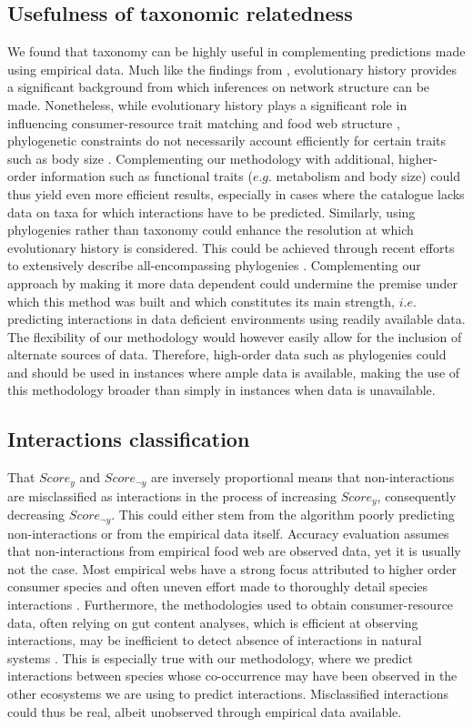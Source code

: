 \subsection{Usefulness of taxonomic relatedness}
We found that taxonomy can be highly useful in complementing predictions made using empirical data. Much like the findings from \citet{eklof2016}, evolutionary history provides a significant background from which inferences on network structure can be made. Nonetheless, while evolutionary history plays a significant role in influencing consumer-resource trait matching and food web structure \citep{mouquet2012, rohr2014}, phylogenetic constraints do not necessarily account efficiently for certain traits such as body size \citep{eklof2016}. Complementing our methodology with additional, higher-order information such as functional traits ($e.g.$ metabolism and body size) could thus yield even more efficient results, especially in cases where the catalogue lacks data on taxa for which interactions have to be predicted. Similarly, using phylogenies rather than taxonomy could enhance the resolution at which evolutionary history is considered. This could be achieved through recent efforts to extensively describe all-encompassing phylogenies \citep[e.g.][]{Hedges2015}. Complementing our approach by making it more data dependent could undermine the premise under which this method was built and which constitutes its main strength, $i.e.$ predicting interactions in data deficient environments using readily available data. The flexibility of our methodology would however easily allow for the inclusion of alternate sources of data. Therefore, high-order data such as phylogenies could and should be used in instances where ample data is available, making the use of this methodology broader than simply in instances when data is unavailable.

\subsection{Interactions classification}
That $Score_{y}$ and $Score_{\neg y}$ are inversely proportional means that non-interactions are misclassified as interactions in the process of increasing $Score_y$, consequently decreasing $Score_{\neg y}$. This could either stem from the algorithm poorly predicting non-interactions or from the empirical data itself. Accuracy evaluation assumes that non-interactions from empirical food web are observed data, yet it is usually not the case. Most empirical webs have a strong focus attributed to higher order consumer species and often uneven effort made to thoroughly detail species interactions \citep{dunne2006}. Furthermore, the methodologies used to obtain consumer-resource data, often relying on gut content analyses, which is efficient at observing interactions, may be inefficient to detect absence of interactions in natural systems \citep{dunne2006}. This is especially true with our methodology, where we predict interactions between species whose co-occurrence may have been observed in the other ecosystems we are using to predict interactions. Misclassified interactions could thus be real, albeit unobserved through empirical data available.

